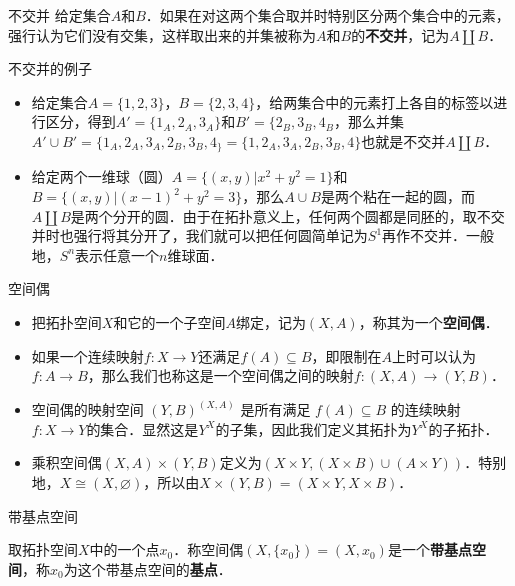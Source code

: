 

\begin{definition}{不交并}
给定集合$A$和$B$．如果在对这两个集合取并时特别区分两个集合中的元素，强行认为它们没有交集，这样取出来的并集被称为$A$和$B$的\textbf{不交并}，记为$A\amalg B$．
\end{definition}

\begin{example}{不交并的例子}
\begin{itemize}
\item 给定集合$A=\{1,2,3\}$，$B=\{2,3,4\}$，给两集合中的元素打上各自的标签以进行区分，得到$A'=\{1_A, 2_A, 3_A\}$和$B'=\{2_B, 3_B, 4_B$，那么并集$A'\cup B'=\{1_A, 2_A, 3_A, 2_B, 3_B, 4_\}=\{1, 2_A, 3_A, 2_B, 3_B, 4\}$也就是不交并$A\amalg B$．
\item 给定两个一维球（圆）$A=\{(x, y)|x^2+y^2=1\}$和$B=\{(x, y)|(x-1)^2+y^2=3\}$，那么$A\cup B$是两个粘在一起的圆，而$A\amalg B$是两个分开的圆．由于在拓扑意义上，任何两个圆都是同胚的，取不交并时也强行将其分开了，我们就可以把任何圆简单记为$S^1$再作不交并．一般地，$S^n$表示任意一个$n$维球面．
\end{itemize}
\end{example}

\begin{definition}{空间偶}
\begin{itemize}
\item 把拓扑空间$X$和它的一个子空间$A$绑定，记为$(X, A)$，称其为一个\textbf{空间偶}．
\item 如果一个连续映射$f:X\rightarrow Y$还满足$f(A)\subseteq B$，即限制在$A$上时可以认为$f:A\rightarrow B$，那么我们也称这是一个空间偶之间的映射$f:(X, A)\rightarrow(Y, B)$．
\item 空间偶的映射空间 $(Y, B)^{(X, A)}$ 是所有满足 $f(A)\subseteq B$ 的连续映射$f:X\rightarrow Y$的集合．显然这是$Y^X$的子集，因此我们定义其拓扑为$Y^X$的子拓扑．
\item 乘积空间偶$(X, A)\times(Y,B)$定义为$(X\times Y, (X\times B)\cup(A\times Y))$．特别地，$X\cong(X, \varnothing)$，所以由$X\times(Y, B)=(X\times Y, X\times B)$．


\end{itemize}
\end{definition}

\begin{definition}{带基点空间}

取拓扑空间$X$中的一个点$x_0$．称空间偶$(X, \{x_0\})=(X, x_0)$是一个\textbf{带基点空间}，称$x_0$为这个带基点空间的\textbf{基点}．

\end{definition}

